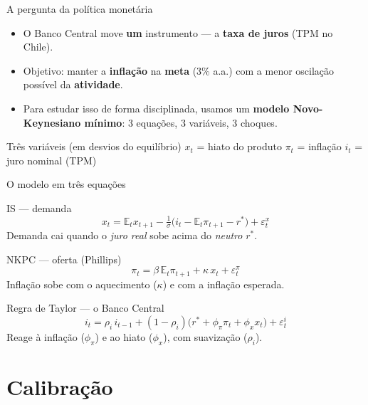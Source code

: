 \documentclass[aspectratio=169,11pt]{beamer}
\begin{document}
\begin{frame}{A pergunta da política monetária}
  \begin{itemize}
    \item O Banco Central move \textbf{um} instrumento --- a \textbf{taxa de juros} (TPM no Chile).
    \item Objetivo: manter a \textbf{inflação} na \textbf{meta} (3\% a.a.) com a menor oscilação
          possível da \textbf{atividade}.
    \item Para estudar isso de forma disciplinada, usamos um \textbf{modelo Novo-Keynesiano mínimo}:
          3 equações, 3 variáveis, 3 choques.
  \end{itemize}
  \begin{alertblock}{Três variáveis (em desvios do equilíbrio)}
    $x_t$ = hiato do produto \quad $\pi_t$ = inflação \quad $i_t$ = juro nominal (TPM)
  \end{alertblock}
\end{frame}

\begin{frame}{O modelo em três equações}
  \begin{block}{IS --- demanda}
    \[ x_t = \mathbb{E}_t x_{t+1} - \tfrac{1}{\sigma}\big(i_t - \mathbb{E}_t\pi_{t+1} - r^\ast\big) + \varepsilon^x_t \]
    Demanda cai quando o \emph{juro real} sobe acima do \emph{neutro} $r^\ast$.
  \end{block}
  \begin{block}{NKPC --- oferta (Phillips)}
    \[ \pi_t = \beta\,\mathbb{E}_t\pi_{t+1} + \kappa\,x_t + \varepsilon^\pi_t \]
    Inflação sobe com o aquecimento ($\kappa$) e com a inflação esperada.
  \end{block}
  \begin{block}{Regra de Taylor --- o Banco Central}
    \[ i_t = \rho_i\,i_{t-1} + (1-\rho_i)\big(r^\ast + \phi_\pi\pi_t + \phi_x x_t\big) + \varepsilon^i_t \]
    Reage à inflação ($\phi_\pi$) e ao hiato ($\phi_x$), com suavização ($\rho_i$).
  \end{block}
\end{frame}

\section{Calibração}
\end{document}
